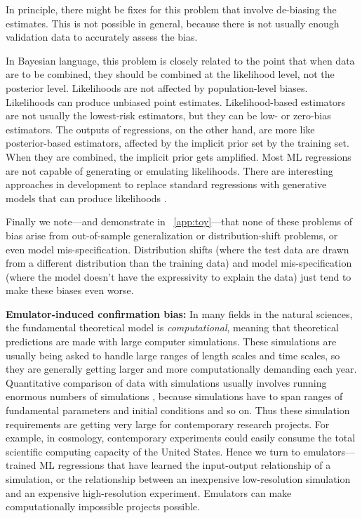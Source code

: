 \documentclass{article}
\renewcommand{\paragraph}[1]{\noindent\par\textbf{#1}}
\begin{document}
In principle, there might be fixes for this problem that involve de-biasing the estimates.
This is not possible in general, because there is not usually enough validation data to accurately assess the bias.

In Bayesian language, this problem is closely related to the point that when data are to be combined, they should be combined at the likelihood level, not the posterior level.
Likelihoods are not affected by population-level biases.
Likelihoods can produce unbiased point estimates.
Likelihood-based estimators are not usually the lowest-risk estimators, but they can be low- or zero-bias estimators.
The outputs of regressions, on the other hand, are more like posterior-based estimators, affected by the implicit prior set by the training set.
When they are combined, the implicit prior gets amplified.
Most ML regressions are not capable of generating or emulating likelihoods.
There are interesting approaches in development to replace standard regressions with generative models that can produce likelihoods \cite{cannon, likelihood_ratio, biwei}.

Finally we note---and demonstrate in \appendixname~\ref{app:toy}---that none of these problems of bias arise from out-of-sample generalization or distribution-shift problems, or even model mis-specification.
Distribution shifts (where the test data are drawn from a different distribution than the training data) and model mis-specification (where the model doesn't have the expressivity to explain the data) just tend to make these biases even worse.

\paragraph{Emulator-induced confirmation bias:}
In many fields in the natural sciences, the fundamental theoretical model is \emph{computational}, meaning that theoretical predictions are made with large computer simulations.
These simulations are usually being asked to handle large ranges of length scales and time scales, so they are generally getting larger and more computationally demanding each year.
Quantitative comparison of data with simulations usually involves running enormous numbers of simulations \cite{abc}, because simulations have to span ranges of fundamental parameters and initial conditions and so on.
Thus these simulation requirements are getting very large for contemporary research projects.
For example, in cosmology, contemporary experiments could easily consume the total scientific computing capacity of the United States.
Hence we turn to emulators---trained ML regressions that have learned the input-output relationship of a simulation, or the relationship between an inexpensive low-resolution simulation and an expensive high-resolution experiment.
Emulators can make computationally impossible projects possible.
\end{document}
